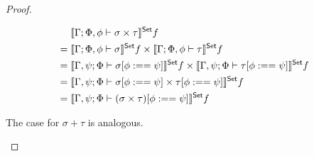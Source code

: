\documentclass[acmsmall,review,anonymous]{acmart}
\theoremstyle{definition}
\begin{document}
\begin{proof}
\begin{itemize}
    \begin{align*}
           & \llbracket{\Gamma; \Phi, \phi \vdash \sigma \times \tau}\rrbracket^{\mathsf{Set}} f \\
      = \; & \llbracket{\Gamma; \Phi, \phi \vdash \sigma}\rrbracket^{\mathsf{Set}} f \times \llbracket{\Gamma; \Phi, \phi \vdash \tau}\rrbracket^{\mathsf{Set}} f \\
      = \; & \llbracket{\Gamma, \psi; \Phi \vdash \sigma[\phi :== \psi]}\rrbracket^{\mathsf{Set}} f \times \llbracket{\Gamma, \psi; \Phi \vdash \tau[\phi :== \psi]}\rrbracket^{\mathsf{Set}} f \\
      = \; & \llbracket{\Gamma, \psi; \Phi \vdash \sigma[\phi :==\psi] \times \tau[\phi :== \psi]}\rrbracket^{\mathsf{Set}} f \\
      = \; & \llbracket{\Gamma, \psi; \Phi \vdash (\sigma \times \tau)[\phi :== \psi]}\rrbracket^{\mathsf{Set}} f
    \end{align*}


    The case for $\sigma + \tau$ is analogous.
\end{itemize}
\end{proof}
\end{document}
